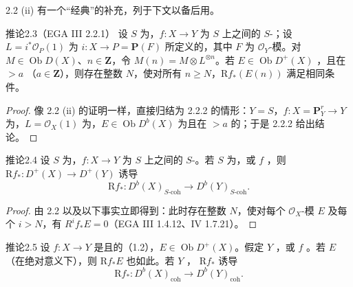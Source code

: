  2.2 (ii) 有一个“经典”的补充，列于下文以备后用。
\begin{SGAresult}{推论}{2.3（EGA III 2.2.1）}
设 $S$ 为，$f:X\to Y$ 为 $S$ 上之间的 $S$-；设 $L=i^*\mathcal O_P(1)$ 为 $i:X\to P=\mathbf P(F)$ 所定义的，其中 $F$ 为 $\mathcal O_Y$-模。对 $M\in\operatorname{Ob}D(X)$、$n\in\mathbf Z$，令 $M(n)=M\otimes L^{\otimes n}$。若 $E\in\operatorname{Ob}D^+(X)$ ，且在 $>a$ （$a\in\mathbf Z$），则存在整数 $N$，使对所有 $n\ge N$，$\mathrm Rf_*(E(n))$ 满足相同条件。
\end{SGAresult}
\begin{proof}
像 2.2 (ii) 的证明一样，直接归结为 2.2.2 的情形：$Y=S$，$f:X=\mathbf P_Y^r\to Y$ 为，$L=\mathcal O_X(1)$ 为，$E\in\operatorname{Ob}D^b(X)$ 为且在 $>a$ 的；于是 2.2.2 给出结论。
\end{proof}
\begin{SGAresult}{推论}{2.4}
设 $S$ 为，$f:X\to Y$ 为 $S$ 上之间的 $S$-。若 $S$ 为，或 $f$ ，则 $\mathrm Rf_*:D^+(X)\to D^+(Y)$ 诱导
\[\mathrm Rf_*:D^b(X)_{S\text{-coh}}\longrightarrow D^b(Y)_{S\text{-coh}}.\]
\end{SGAresult}
\begin{proof}
由 2.2 以及以下事实立即得到：此时存在整数 $N$，使对每个 $\mathcal O_X$-模 $E$ 及每个 $i>N$，有 $R^if_*E=0$（EGA III 1.4.12、IV 1.7.21）。
\end{proof}
\begin{SGAresult}{推论}{2.5}
设 $f:X\to Y$ 是且的（1.2），$E\in\operatorname{Ob}D^+(X)$。假定 $Y$ ，或 $f$ 。若 $E$（在绝对意义下），则 $\mathrm Rf_*E$ 也如此。若 $Y$ ， $\mathrm Rf_*$ 诱导
\[\mathrm Rf_*:D^b(X)_{\mathrm{coh}}\longrightarrow D^b(Y)_{\mathrm{coh}}.\]
\end{SGAresult}
